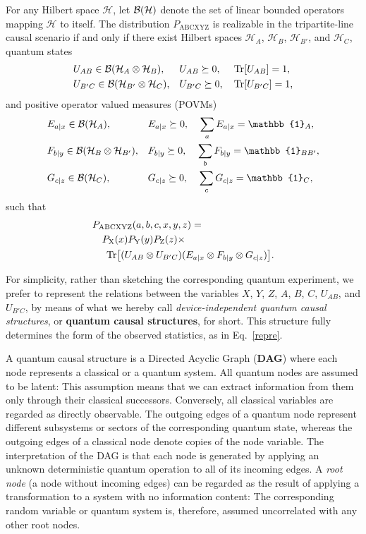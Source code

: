 \documentclass[superscriptaddress,aps,prx,nofootinbib,twocolumn,twoside,reprint,letterpaper,longbibliography]{revtex4-2}
\newcommand{\term}[1]{\textcolor{medblue}{\textbf{#1}}}
\DeclarePairedDelimiter{\braks}{\lbrack}{\rbrack}
\def\id{\boldsymbol{\mathbb{1}}}
\DeclareMathOperator{\Tr}{Tr}
\def\H{{\mathcal H}}
\begin{document}
For any Hilbert space $\H$, let ${\cal B}(\H)$ denote the set of linear bounded operators mapping $\H$ to itself. The distribution ${P_{\text{ABCXYZ}}}$ is realizable in the tripartite-line causal scenario if and only if there exist Hilbert spaces ${\H_A}$, ${\H_B}$, ${\H_{B'}}$, and ${\H_C}$, quantum states
%
\begin{align}\begin{aligned}
&U_{AB}\in{\cal B}(\H_A\otimes\H_B), &&U_{AB}\succeq 0,&&\Tr\braks{U_{AB}}=1,\\
&U_{B'C}\in{\cal B}(\H_{B'}\otimes\H_C), &&U_{B'C}\succeq 0,&&\Tr\braks{U_{B'C}}=1,
\label{states}
\end{aligned}\end{align}
\noindent and positive operator valued measures (POVMs)
%
\begin{align}\begin{aligned}
&E_{a|x}\in {\cal B}(\H_A), && E_{a|x}\succeq 0,\;\;\;\; \sum_a E_{a|x}=\id_A,\\
&F_{b|y}\in {\cal B}(\H_B\otimes \H_{B'}), && F_{b|y}\succeq 0,\;\;\;\; \sum_b F_{b|y}=\id_{BB'},\\
&G_{c|z}\in {\cal B}(\H_C), && G_{c|z}\succeq 0,\;\;\;\; \sum_c G_{c|z}=\id_C,
\label{meas}
\end{aligned}\end{align}
such that
%
\begin{align}\begin{split}
&P_{\text{ABCXYZ}}(a,b,c,x,y,z)=\\
&\quad P_\text{X}(x)P_\text{Y}(y)P_\text{Z}(z)\times\\
&\quad\; \Tr\braks*{(U_{AB}\otimes U_{B'C})(E_{a|x}\otimes F_{b|y}\otimes G_{c|z})}.
\label{repre}
\end{split}\end{align}

For simplicity, rather than sketching the corresponding quantum experiment, we prefer to represent the relations between the variables $X$, $Y$, $Z$, $A$, $B$, $C$, $U_{AB}$, and $U_{B'C}$, by means of what we hereby call \emph{device-independent quantum causal structures}, or \term{quantum causal structures}, for short. This structure fully determines the form of the observed statistics, as in Eq.~\eqref{repre}.

A quantum causal structure is a Directed Acyclic Graph (\term{DAG}) where each node represents a classical or a quantum system. All quantum nodes are assumed to be latent: This assumption means that we can extract information from them only through their classical successors. Conversely, all classical variables are regarded as directly observable. The outgoing edges of a quantum node represent different subsystems or sectors of the corresponding quantum state, whereas the outgoing edges of a classical node denote copies of the node variable. The interpretation of the DAG is that each node is generated by applying an unknown deterministic quantum operation to all of its incoming edges. A \emph{root node} (a node without incoming edges) can be regarded as the result of applying a transformation to a system with no information content: The corresponding random variable or quantum system is, therefore, assumed uncorrelated with any other root nodes.
\end{document}
